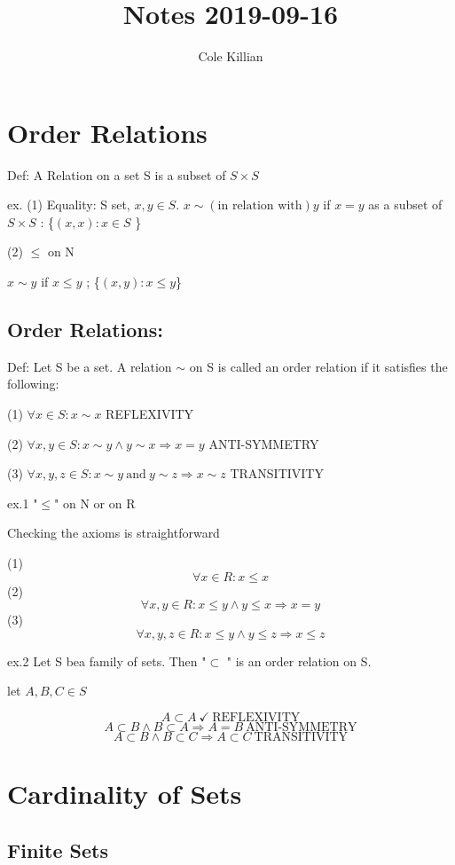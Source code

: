 \documentclass[class=scrartcl, crop=false]{standalone}
\begin{document}
\title{Notes 2019-09-16}
\author{Cole Killian}


\section{Order Relations}

Def: A Relation on a set S is a subset of $S \times S$

ex. (1) Equality: S set,  $x, y \in S$. $x \sim (\text{in relation with}) y$ if $x = y$ as a subset of $S \times S$ : \{$(x, x): x \in S$ \}

(2) $\leq$ on N

$x \sim y$ if $x \leq y$ ; \{$(x, y): x \leq y $\}

\subsection{Order Relations:}

Def: Let S be a set. A relation $\sim$ on S is called an order relation if it satisfies the following:

(1) $\forall x \in S: x \sim x$ REFLEXIVITY

(2) $\forall x, y \in S: x \sim y \wedge y \sim x \Rightarrow x = y$ ANTI-SYMMETRY

(3) $\forall x, y, z \in S: x \sim y \ \text{and} \  y \sim z \Rightarrow x \sim z$ TRANSITIVITY

ex.1 "$\leq$" on N or on R
 
Checking the axioms is straightforward

(1) $$\forall x \in R: x \leq x$$
(2) $$ \forall x, y \in R: x \leq y \wedge y \leq x \Rightarrow x = y $$
(3) $$ \forall x, y, z \in R: x \leq y \wedge y \leq z \Rightarrow x \leq z $$

ex.2 Let S bea family of sets. Then "$\subset$ " is an order relation on S.

let $A, B, C \in S$

$$A \subset A \ \checkmark \ \text{REFLEXIVITY}$$ 
$$ A \subset B \wedge B \subset A \Rightarrow A = B \ \text{ANTI-SYMMETRY}$$ 
$$A \subset B \wedge B \subset C \Rightarrow A \subset C \ \text{TRANSITIVITY}$$ 

\section*{Cardinality of Sets}

\subsection*{Finite Sets}
\end{document}
